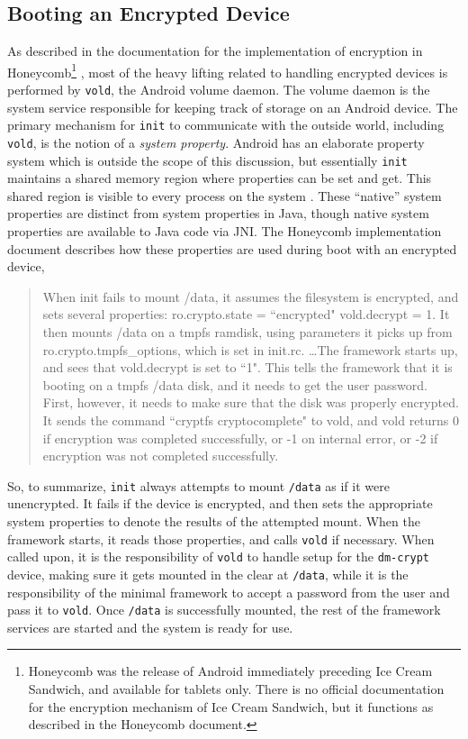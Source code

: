 \subsection{Booting an Encrypted Device} \label{ssec:encryptionboot}

As described in the documentation for the implementation of encryption in Honeycomb\footnote{Honeycomb was the release of Android
immediately preceding Ice Cream Sandwich, and available for tablets only. There is no official documentation for the encryption
mechanism of Ice Cream Sandwich, but it functions as described in the Honeycomb document.} \cite{honeycombcrypt}, most of the heavy
lifting related to handling encrypted devices is performed by \texttt{vold}, the Android volume daemon. The volume daemon is the
system service responsible for keeping track of storage on an Android device. The primary mechanism for \texttt{init} to communicate
with the outside world, including \texttt{vold}, is the notion of a \emph{system property}.  Android has an elaborate property system
which is outside the scope of this discussion, but essentially \texttt{init} maintains a shared memory region where properties can
be set and get. This shared region is visible to every process on the system \cite{propertysystem}. These ``native'' system
properties are distinct from system properties in Java, though native system properties are available to Java code via JNI. The
Honeycomb implementation document describes how these properties are used during boot with an encrypted device,

\begin{quote} When init fails to mount /data, it assumes the filesystem is encrypted, and sets several properties: ro.crypto.state =
``encrypted" vold.decrypt = 1. It then mounts /data on a tmpfs ramdisk, using parameters it picks up from ro.crypto.tmpfs\_options,
which is set in init.rc.  \ldots The framework starts up, and sees that vold.decrypt is set to ``1". This tells the framework that it
is booting on a tmpfs /data disk, and it needs to get the user password. First, however, it needs to make sure that the disk was
properly encrypted. It sends the command ``cryptfs cryptocomplete" to vold, and vold returns 0 if encryption was completed
successfully, or -1 on internal error, or -2 if encryption was not completed successfully.  \hspace{\fill}\cite{honeycombcrypt}
\end{quote}

So, to summarize, \texttt{init} always attempts to mount \texttt{/data} as if it were unencrypted. It fails if the device is
encrypted, and then sets the appropriate system properties to denote the results of the attempted mount. When the framework starts, it
reads those properties, and calls \texttt{vold} if necessary. When called upon, it is the responsibility of \texttt{vold} to handle
setup for the \texttt{dm-crypt} device, making sure it gets mounted in the clear at \texttt{/data}, while it is the responsibility of the
minimal framework to accept a password from the user and pass it to \texttt{vold}. Once \texttt{/data} is successfully mounted, the rest of
the framework services are started and the system is ready for use.

